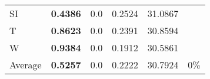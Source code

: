 \documentclass[11pt, a4paper]{article}
\begin{document}
\begin{table}[H]
\begin{tabular}{llllll}
SI                        & \textbf{0.4386}                   & 0.0                               & 0.2524                               & 31.0867                            &                          \\
T                              & \textbf{0.8623}                   & 0.0                               & 0.2391                               & 30.8594                            &                          \\
W                             & \textbf{0.9384}                   & 0.0                               & 0.1912                               & 30.5861                            &                          \\ \hline
Average                               & \textbf{0.5257}                   & 0.0                               & 0.2222                               & 30.7924                            & 0\%
\end{tabular}
\end{table}
\end{document}
